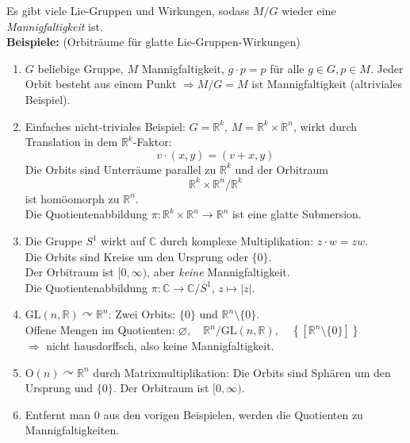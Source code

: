 \documentclass[fleqn, 12pt, letterpaper]{article}
\begin{document}
Es gibt viele Lie-Gruppen und Wirkungen, sodass \( M/G \) wieder eine \emph{Mannigfaltigkeit} ist. \\

\textbf{Beispiele:} (Orbiträume für glatte Lie-Gruppen-Wirkungen)
\begin{enumerate}
  \item \( G \) beliebige Gruppe, \( M \) Mannigfaltigkeit, \( g \cdot p = p \) für alle \( g \in G, p \in M \). Jeder Orbit besteht aus einem Punkt \( \Rightarrow M/G = M \) ist Mannigfaltigkeit (altriviales Beispiel).

  \item Einfaches nicht-triviales Beispiel: \( G = \mathbb{R}^k \), \( M = \mathbb{R}^k \times \mathbb{R}^n \), wirkt durch Translation in dem \( \mathbb{R}^k \)-Faktor:
  \[
    v \cdot (x, y) = (v + x, y)
  \]
  Die Orbits sind Unterräume parallel zu \( \mathbb{R}^k \) und der Orbitraum
  \[
    \mathbb{R}^k \times \mathbb{R}^n / \mathbb{R}^k
  \]
  ist homöomorph zu \( \mathbb{R}^n \). \\
  Die Quotientenabbildung \( \pi: \mathbb{R}^k \times \mathbb{R}^n \to \mathbb{R}^n \) ist eine glatte Submersion.


  \item Die Gruppe \( S^1 \) wirkt auf \( \mathbb{C} \) durch komplexe Multiplikation: \( z \cdot w = zw \). \\
  Die Orbits sind Kreise um den Ursprung oder \( \{0\} \). \\
  Der Orbitraum ist \( [0, \infty) \), aber \emph{keine} Mannigfaltigkeit. \\
  Die Quotientenabbildung \( \pi: \mathbb{C} \to \mathbb{C}/S^1 \), \( z \mapsto |z| \).

  \item \( \mathrm{GL}(n, \mathbb{R}) \curvearrowright \mathbb{R}^n \): Zwei Orbits: \( \{0\} \) und \( \mathbb{R}^n \setminus \{0\} \). \\
  Offene Mengen im Quotienten: \( \varnothing, \quad \mathbb{R}^n / \mathrm{GL}(n, \mathbb{R}), \quad \left\{ [\mathbb{R}^n \setminus \{0\}] \right\} \) \\
  \(\Rightarrow\) nicht hausdorffsch, also keine Mannigfaltigkeit.

  \item \( \mathrm{O}(n) \curvearrowright \mathbb{R}^n \) durch Matrixmultiplikation: Die Orbits sind Sphären um den Ursprung und \( \{0\} \). Der Orbitraum ist \( [0, \infty) \).

  \item Entfernt man \( 0 \) aus den vorigen Beispielen, werden die Quotienten zu Mannigfaltigkeiten.
\end{enumerate}
\end{document}
